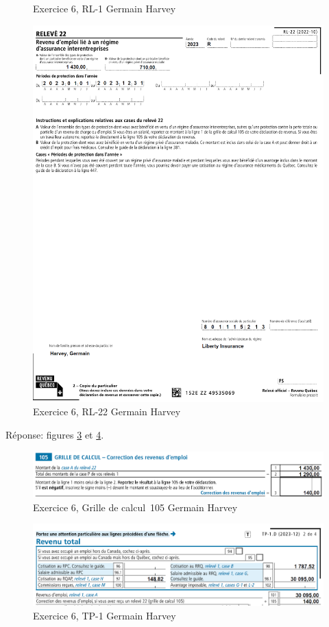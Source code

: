 \begin{sousQuestion}
\begin{figure}
		\caption{Exercice 6, RL-1 Germain Harvey}
		\label{fig:Chap2Exercice6Q1RL1}
	\end{figure}
	\begin{figure}
		\centering
		\includegraphics[width=.9\textwidth]{exercice/2-6/Q1/b-RL22.png}
		\caption{Exercice 6, RL-22 Germain Harvey}
		\label{fig:Chap2Exercice6Q1RL22}
	\end{figure}
\end{sousQuestion}
Réponse: figures \ref{fig:Chap2Exercice6Q1b105Reponse} et \ref{fig:Chap2Exercice6Q1bTP1Reponse}.
\begin{figure}
	\centering
	\includegraphics[width=.9\textwidth]{exercice/2-6/Q1/b-105-reponse.png}
	\caption{Exercice 6, Grille de calcul~105 Germain Harvey}
	\label{fig:Chap2Exercice6Q1b105Reponse}
\end{figure}
\begin{figure}
	\centering
	\includegraphics[width=.9\textwidth]{exercice/2-6/Q1/b-TP1-reponse.png}
	\caption{Exercice 6, TP-1 Germain Harvey}
	\label{fig:Chap2Exercice6Q1bTP1Reponse}
\end{figure}

